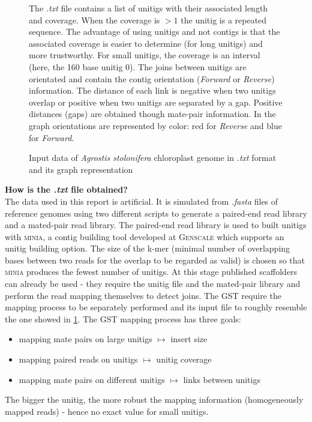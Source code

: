\documentclass[12pt]{article}
\begin{document}
\begin{figure}[h!]
{
}
\caption{Input data of \textit{Agrostis stolonifera} chloroplast genome in \textit{.txt} format and its graph representation}
\label{fig:inpagrostis}
\scriptsize The \textit{.txt} file contains a list of unitigs with their associated length and coverage. When the coverage is $>1$ the unitig is a repeated sequence. The advantage of using unitigs and not contigs is that the associated coverage is easier to determine (for long unitigs) and more trustworthy. For small unitigs, the coverage is an interval (here, the 160 base unitig 0). The joins between unitigs are orientated and contain the contig orientation (\textit{Forward} or \textit{Reverse}) information. The distance of each link is negative when two unitigs overlap or positive when two unitigs are separated by a gap. Positive distances (gaps) are obtained though mate-pair information. In the graph orientations are represented by color: red for \textit{Reverse} and blue for \textit{Forward}.
\end{figure}

\vspace{-0.2cm}
\textbf{How is the \textit{.txt} file obtained? }\\
The data used in this report is artificial. It is simulated from \textit{.fasta} files of reference genomes using two different scripts to generate a paired-end read library and a mated-pair read library. The paired-end read library is used to built unitigs with \textsc{minia}, a contig building tool developed at \textsc{Genscale} which supports an unitig building option. The size of the k-mer (minimal number of overlapping bases between two reads for the overlap to be regarded as valid) is chosen so that \textsc{minia} produces the fewest number of unitigs. At this stage published scaffolders can already be used - they require the unitig file and the mated-pair library and perform the read mapping themselves to detect joins. The GST require the mapping process to be separately performed and its input file to roughly resemble the one showed in \ref{fig:inpagrostis}. The GST mapping process has three goals:
\begin{itemize}
\item mapping mate pairs on large unitigs $\mapsto$ insert size
\item mapping paired reads on unitigs $\mapsto$ unitig coverage
\item mapping mate pairs on different unitigs $\mapsto$ links between unitigs
\end{itemize}
The bigger the unitig, the more robust the mapping information (homogeneously mapped reads) - hence no exact value for small unitigs.
\end{document}
